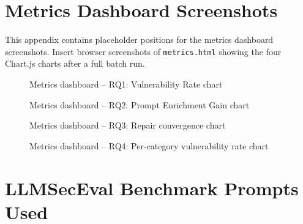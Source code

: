 \documentclass[12pt,a4paper]{report}
\begin{document}
\chapter{Metrics Dashboard Screenshots}
\label{app:screenshots}

This appendix contains placeholder positions for the metrics dashboard
screenshots. Insert browser screenshots of \texttt{metrics.html} showing the
four Chart.js charts after a full batch run.

\begin{figure}[H]
\centering
{}
\caption{Metrics dashboard -- RQ1: Vulnerability Rate chart}
\label{fig:metrics_rq1}
\end{figure}

\begin{figure}[H]
\centering
{}
\caption{Metrics dashboard -- RQ2: Prompt Enrichment Gain chart}
\label{fig:metrics_rq2}
\end{figure}

\begin{figure}[H]
\centering
{}
\caption{Metrics dashboard -- RQ3: Repair convergence chart}
\label{fig:metrics_rq3}
\end{figure}

\begin{figure}[H]
\centering
{}
\caption{Metrics dashboard -- RQ4: Per-category vulnerability rate chart}
\label{fig:metrics_rq4}
\end{figure}

\chapter{LLMSecEval Benchmark Prompts Used}
\label{app:prompts}
\end{document}

